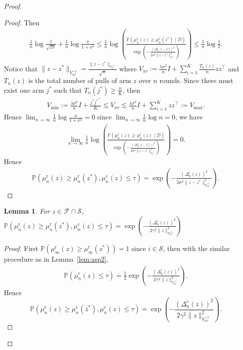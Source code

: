 \documentclass[accepted]{uai2025} %
\theoremstyle{plain}
\newtheorem{lemma}[theorem]{Lemma}
\theoremstyle{definition}
\theoremstyle{remark}
\newcommand{\Deltac}{\Delta^{\mathrm{c}}}
\newcommand{\Deltar}{\Delta^{\mathrm{r}}}
\newcommand{\thetar}{\theta^{\mathrm{r}}}
\newcommand{\muc}{\mu^{\mathrm{c}}}
\newcommand{\mur}{\mu^{\mathrm{r}}}
\newcommand{\PP}{\mathbb{P}} %
\begin{document}
\begin{proof}
\begin{proof}
Then
\begin{align*}
    \frac{1}{n}\log \frac{1}{\sqrt{2\pi}}+\frac{1}{n}\log\frac{x}{1+x^2}\le\frac{1}{n} \log \left(\frac{\PP(\mur_{n}(z)\ge \mur_{n}(z^*) \mid \mathcal{D})}{\exp\left(-\frac{(\langle \thetar_n, z-z^*\rangle)^2}{2\sigma^2 \lVert z-z^* \rVert^2_{V^{-1}_n}}\right)}\right)\le \frac{1}{n} \log \frac{1}{2}.
\end{align*}
Notice that $\lVert z-z^*\rVert_{V_{nr}^{-1}}=\frac{\lVert z-z^*\rVert_{V_{\pi}^{-1}}}{\sqrt{n}}$ where $V_{\pi r}:=\frac{\lambda \sigma^2}{n} I+\sum_{i=1}^K \frac{T_{n}(z)}{n}z z^{\top}$ and $T_{n}(z)$ is the total number of pulls of arm $z$ over $n$ rounds. Since there must exist one arm $j^*$ such that $T_{n}(j^*)\ge \frac{n}{K}$, then 
\begin{align*}
   V_{\min}:=\frac{\lambda\sigma^2}{n}I+ \frac{{j^*}{j^*}^{\top}}{K}\lesssim V_{\pi r}\lesssim \frac{\lambda\sigma^2}{n}I+\sum_{i=1}^K z z^\top:=V_{\max}.
\end{align*}
Hence $\lim_{n\rightarrow \infty} \frac{1}{n}\log \frac{x}{1+x^2}=0$ since $\lim_{n\rightarrow \infty} \frac{1}{n}\log n=0$, we have
\begin{align*}
    \lim_{n\rightarrow \infty} \frac{1}{n} \log \left(\frac{\PP(\mur_{n}(z)\ge \mur_{n}(z) \mid \mathcal{D})}{\exp\left(-\frac{(\langle \thetar_n, z-z^*\rangle)^2}{2\sigma^2 \lVert z-z^* \rVert^2_{V^{-1}_{nr}}}\right)}\right)=0.
\end{align*}
Hence 
\begin{align*}
    \PP(\mur_{n}(z)\ge \mur_{n}(z^*), \muc_{n}(z)\le \tau)\stackrel{\cdot}{=}\exp\left(-\frac{(\Deltar_n(z))^2}{2\sigma^2 \lVert z-z^* \rVert^2_{V^{-1}_{nr}}}\right).
\end{align*}
\end{proof}


\begin{lemma}
\label{lem:asp3}
    For $z\in \overline{\mathcal{F}}\cap \overline{\mathcal{S}}$,
    $\PP(\mur_{n}(z)\ge \mur_{n}(z^*), \muc_{n}(z)\le \tau)\stackrel{\cdot}{=}\exp\left(-\frac{(\Deltac_n(z))^2}{2\gamma^2 \lVert z \rVert^2_{V^{-1}_{nc}}}\right)$
\end{lemma}
\begin{proof}
    First $\PP(\mur_{\infty}(z)\ge \mur_{\infty}(z^*))=1$ since $i\in \mathcal{S}$, then with the similar procedure as in Lemma~\ref{lem:asp2},
\begin{align*}
   \PP(\muc_{n}(z)\le \tau )\stackrel{\cdot}{=} \frac{1}{2}\exp \left( -\frac{(\Deltac_{n}(z))^2}{2\gamma^2 \lVert z \rVert^2_{V^{-1}_{nc}}}\right).
\end{align*}
Hence $$\PP(\mur_{n}(z)\ge \mur_{n}(z^*), \muc_{n}(z)\le \tau)\stackrel{\cdot}{=}\exp\left(-\frac{(\Deltac_n(z))^2}{2\gamma^2 \lVert z \rVert^2_{V^{-1}_{nc}}}\right).$$
\end{proof}



\end{proof}
\end{document}
